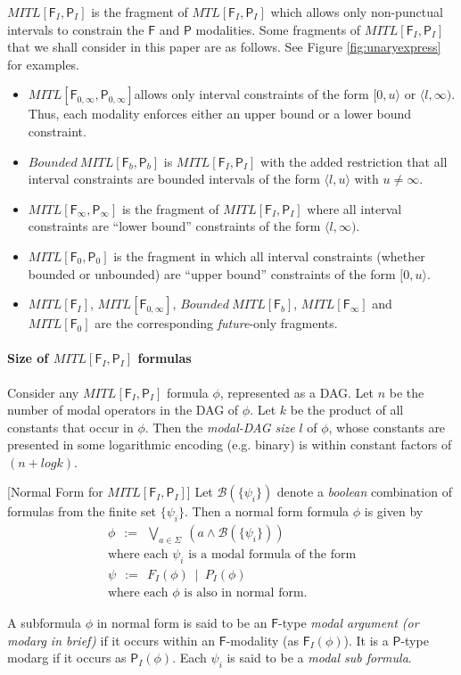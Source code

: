 \documentclass{llncs}
\newcommand{\fut}{\textsf{F}}
\newcommand{\past}{\textsf{P}}
\newcommand{\mtlfp}{\mbox{$\mathit{MTL[\fut_I,\past_I]}$}}
\newcommand{\mitlfp}{\mbox{$\mathit{MITL[\fut_I,\past_I]}$}}
\newcommand{\bmitlfp}{\mbox{$\mathit{Bounded ~MITL[\fut_b,\past_b]}$}}
\newcommand{\mitlf}{\mbox{$\mathit{MITL[\fut_I]}$}}
\newcommand{\mitlfpinf}{\mbox{$\mathit{MITL[\fut_\infty,\past_\infty]}$}}
\newcommand{\mitlfpb}{\bmitlfp}
\newcommand{\mitlfb}{\mbox{$\mathit{Bounded ~MITL[\fut_b]}$}}
\newcommand{\mitlfpzinf}{\mbox{$\mathit{MITL[\fut_{0,\infty},\past_{0,\infty}]}$}}
\newcommand{\mitlfzinf}{\mbox{$\mathit{MITL[\fut_{0,\infty}]}$}}
\newcommand{\mitlfinf}{\mbox{$\mathit{MITL[\fut_{\infty}]}$}}
\newcommand{\mitlfpz}{\mbox{$\mathit{MITL[\fut_{0},\past_{0}]}$}}
\newcommand{\mitlfz}{\mbox{$\mathit{MITL[\fut_{0}]}$}}
\begin{document}
\mitlfp\/ is the fragment of \mtlfp\/ which allows only non-punctual intervals to constrain the $\fut$ and $\past$ modalities. Some fragments of \mitlfp\/ that we shall consider in this paper are as follows. See Figure \ref{fig:unaryexpress} for examples.
\begin{itemize}
\item \mitlfpzinf allows only interval constraints of the form $[0,u\rangle$ or $\langle l,\infty)$. Thus, each modality enforces either an upper bound or a lower bound constraint.  
\item \mitlfpb\/ is \mitlfp\/ with the added restriction that all interval constraints are bounded intervals of the form $\langle l,u \rangle $ with $u \not=\infty$. 
\item \mitlfpinf\/ is the fragment of \mitlfp\/ where all interval constraints are ``lower bound'' constraints of the form $\langle l, \infty)$. 
\item \mitlfpz\/ is the fragment in which all interval constraints (whether bounded or unbounded) are ``upper bound'' constraints of the form $[0,u \rangle$.
\item \mitlf, \mitlfzinf, \mitlfb, \mitlfinf\/ and \mitlfz\/ are the corresponding \emph{future}-only fragments. 
\end{itemize}

\paragraph{Size of \mitlfp\/ formulas}
Consider any \mitlfp\/ formula $\phi$, represented as a DAG. Let $n$ be the number of modal operators in the DAG of $\phi$. Let $k$ be the product of all constants that occur in $\phi$. Then the \emph{modal-DAG size} $l$ of $\phi$, whose constants are presented in some logarithmic encoding (e.g. binary) is within constant factors of $(n + log k)$. 



\begin{definition}{[Normal Form for \mitlfp]}
\label{def:norm}
Let ${\mathscr B}(\{\psi_i\})$ denote a {\em boolean} combination of formulas from the finite set $\{ \psi_i \}$. Then a normal form formula $\phi$ is given by 
\[
 \begin{array}{l}
   \phi ~~:=~~ \bigvee\limits_{a \in \Sigma} ~ (a \land {\mathscr B}(\{\psi_i\})) \\
   \mbox{where each $\psi_i$ is a modal formula of the form}\\
   \psi ~~:=~~ F_{I}(\phi) ~\mid~ P_{I}(\phi)\\
   \mbox{where each $\phi$ is also in normal form.}
 \end{array}
\]

\end{definition}
A subformula $\phi$ in normal form is said to be an $\fut$-type \emph{modal argument (or modarg in brief)} if it occurs within an $\fut$-modality (as $\fut_I(\phi)$).  It is a $\past$-type modarg if it occurs as $\past_{I}(\phi)$. Each $\psi_i$ is said to be a \emph{modal sub formula}.
\end{document}
